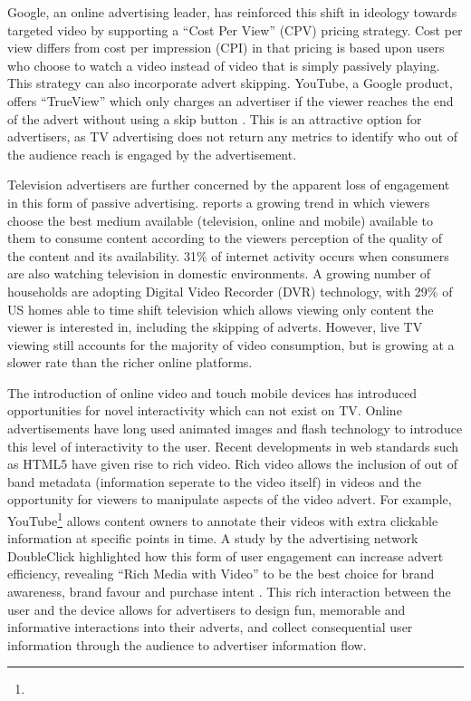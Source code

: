 	Google, an online advertising leader, has reinforced this shift in ideology towards targeted video by supporting a ``Cost Per View'' (CPV) pricing strategy. Cost per view differs from cost per impression (CPI) in that pricing is based upon users who choose to watch a video instead of video that is simply passively playing. This strategy can also incorporate advert skipping. YouTube, a Google product, offers ``TrueView'' which only charges an advertiser if the viewer reaches the end of the advert without using a skip button \citep{trueview}. This is an attractive option for advertisers, as TV advertising does not return any metrics to identify who out of the audience reach is engaged by the advertisement.

	Television advertisers are further concerned by the apparent loss of engagement in this form of passive advertising. \citet{three-screen} reports a growing trend in which viewers choose the best medium available (television, online and mobile) available to them to consume content according to the viewers perception of the quality of the content and its availability. 31\% of internet activity occurs when consumers are also watching television in domestic environments. A growing number of households are adopting Digital Video Recorder (DVR) technology, with 29\% of US homes able to time shift television which allows viewing only content the viewer is interested in, including the skipping of adverts. However, live TV viewing still accounts for the majority of video consumption, but is growing at a slower rate than the richer online platforms. \citep{three-screen}

	The introduction of online video and touch mobile devices has introduced opportunities for novel interactivity which can not exist on TV. Online advertisements have long used animated images and flash technology to introduce this level of interactivity to the user. Recent developments in web standards such as HTML5 have given rise to rich video. Rich video allows the inclusion of out of band metadata (information seperate to the video itself) in videos and the opportunity for viewers to manipulate aspects of the video advert. For example, YouTube\footnote{} allows content owners to annotate their videos with extra clickable information at specific points in time. A study by the advertising network DoubleClick highlighted how this form of user engagement can increase advert efficiency, revealing ``Rich Media with Video'' to be the best choice for brand awareness, brand favour and purchase intent \citep{rich-video}. This rich interaction between the user and the device  allows for advertisers to design fun, memorable and informative interactions into their adverts, and collect consequential user information through the audience to advertiser information flow.

